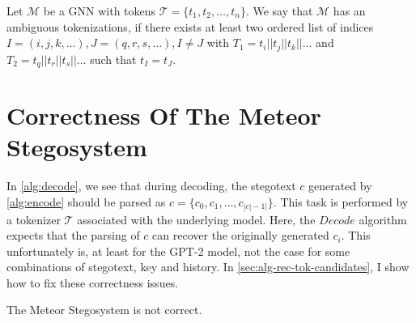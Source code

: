 \begin{definition}
	Let $\mathcal{M}$ be a GNN with tokens $\mathcal{T} = \{ t_1, t_2, \dots, t_n \}$.
	We say that $\mathcal{M}$ has an ambiguous tokenizations, if there exists at least two ordered list of indices $I = (i, j, k, \dots), J = (q, r, s, \dots), I \neq J$ with $T_1 = t_i || t_j || t_k || \dots$ and $T_2 = t_q || t_r || t_s || \dots$ such that $t_I = t_J$.
\end{definition}

\section{Correctness Of The Meteor Stegosystem}

In \autoref{alg:decode}, we see that during decoding, the stegotext $c$ generated by \autoref{alg:encode} should be parsed as $c = \{c_0,c_1, \dots, c_{|c|-1|}\}$.
This task is performed by a tokenizer $\mathcal{T}$ associated with the underlying model.
Here, the $Decode$ algorithm expects that the parsing of $c$ can recover the originally generated $c_i$.
This unfortunately is, at least for the GPT-2 model, not the case for some combinations of stegotext, key and history.
In \autoref{sec:alg-rec-tok-candidates}, I show how to fix these correctness issues.

\begin{theorem}
The Meteor Stegosystem is not correct.
\end{theorem}

